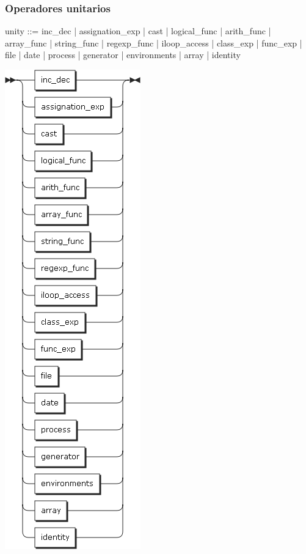 \subsubsection{Operadores unitarios}
\begin{multicols}{2}
\begin{myverbatim}      
unity ::=   inc_dec
         |  assignation_exp
         |  cast
         |  logical_func
         |  arith_func
         |  array_func
         |  string_func
         |  regexp_func
         |  iloop_access
         |  class_exp
         |  func_exp
         |  file
         |  date
         |  process
         |  generator
         |  environments
         |  array
         |  identity
\end{myverbatim}  
\columnbreak	
\begin{center}
\includegraphics[scale=0.5]{diagram/unity.png} \\
\end{center}
\end{multicols}


